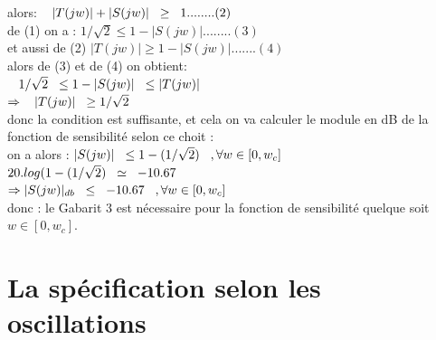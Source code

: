 \documentclass[12pt, a4paper, openany]{report}
\begin{document}
alors: $\hspace{0.3cm} |T(jw)|+|S(jw)|\hspace{0.2cm}\geq \hspace{0.2cm} 1........(2)$\\  

de (1) on a : $1/\sqrt{2}\leq 1-|S(jw)|........(3)$ \\

et aussi de (2) $|T(jw)|\geq 1-|S(jw)|.......(4)$ \\

alors de (3) et de (4) on obtient: \\
 
 $\hspace{0.3cm} 1/\sqrt{2}\hspace{0.2cm} \leq 1-|S(jw)| \hspace{0.2cm}\leq |T(jw)|$ \\
 
 $\Rightarrow \hspace{0.3cm} |T(jw)| \hspace{0.2cm} \geq 1/\sqrt{2}$ \\
 
donc la condition est suffisante, et cela on va calculer le module en dB de la fonction de sensibilité selon ce choit : \\

on a alors : $|S(jw)|\hspace{0.2cm}\leq 1-(1/\sqrt{2}) \hspace{0.3cm} , \forall w\in[0,w_{c}] $ \\ 

 $20.log(1-(1/\sqrt{2})\hspace{0.2cm} \simeq \hspace{0.2cm} -10.67$  \\
 
 $\Rightarrow |S(jw)|_{db}\hspace{0.2cm} \leq \hspace{0.2cm} -10.67 \hspace{0.3cm} , \forall w\in[0,w_{c}] $  \\
 
 donc : le Gabarit 3 est nécessaire pour la fonction de sensibilité quelque soit $w\in[0,w_{c}]. $   
 
 
\section{La spécification selon les oscillations}  %
\end{document}
